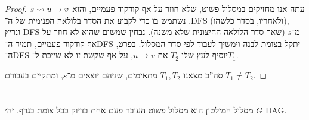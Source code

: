 \documentclass[]{../../../../tex/classes/homework}
\begin{document}
\begin{enumerate}[(A)]
\begin{proof}
			עתה אנו מחזיקים במסלול פשוט, שלא חוזר על אף קודקוד פעמיים, והוא $s \rightsquigarrow u \to v$. נשתמש בו כדי לקבוע את הסדר בלולאה הפנימית של ה־DFS (ולאחריו, בסדר כלשהו), ונריץ DFS מ־$s$ (שאר סדר הלולאה החיצונית שלא משנה). נבחין שמשום שהוא לא חוזר על אף קודקוד פעמיים, תמיד ה־DFS יתקל בצומת לבנה וימשיך לעבוד לפי סדר המסלול. בפרט, ה־DFS יוסיף לעץ שלו $T_2$ את $u \to v$, על אף שקשת זו לא שייכת ל־$T_1$. 
			
			סה''כ מצאנו $T_1, T_2$ מתאימים, שניהם יוצאים מ־$s$, ומתקיים בעבורם $T_1 \neq T_2$. 
		\end{proof}
	\end{enumerate}
	
	\npage
	\section{}
	מסלול המילטון הוא מסלול פשוט העובר פעם אחת בדיוק בכל צומת בגרף. יהי $G$ DAG. 
\end{document}
